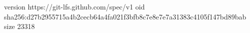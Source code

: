 version https://git-lfs.github.com/spec/v1
oid sha256:d27b2955715a4b2cecb64a4fa021f3bfb8c7e8e7e7a31383c4105f147bd89bab
size 23318
